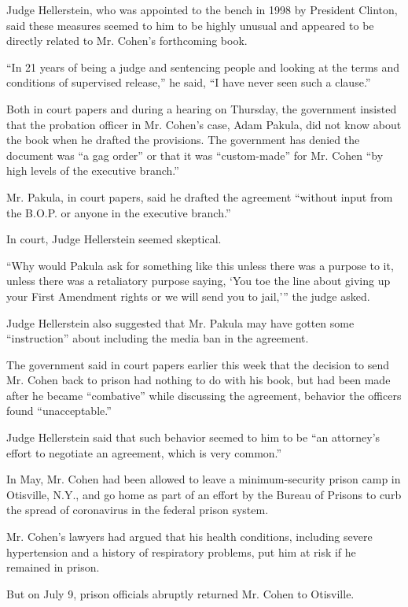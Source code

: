 Judge Hellerstein, who was appointed to the bench in 1998 by President
Clinton, said these measures seemed to him to be highly unusual and
appeared to be directly related to Mr. Cohen's forthcoming book.

``In 21 years of being a judge and sentencing people and looking at the
terms and conditions of supervised release,'' he said, ``I have never
seen such a clause.''

Both in court papers and during a hearing on Thursday, the government
insisted that the probation officer in Mr. Cohen's case, Adam Pakula,
did not know about the book when he drafted the provisions. The
government has denied the document was ``a gag order'' or that it was
``custom-made'' for Mr. Cohen ``by high levels of the executive
branch.''

Mr. Pakula, in court papers, said he drafted the agreement ``without
input from the B.O.P. or anyone in the executive branch.''

In court, Judge Hellerstein seemed skeptical.

``Why would Pakula ask for something like this unless there was a
purpose to it, unless there was a retaliatory purpose saying, `You toe
the line about giving up your First Amendment rights or we will send you
to jail,''' the judge asked.

Judge Hellerstein also suggested that Mr. Pakula may have gotten some
``instruction'' about including the media ban in the agreement.

The government said in court papers earlier this week that the decision
to send Mr. Cohen back to prison had nothing to do with his book, but
had been made after he became ``combative'' while discussing the
agreement, behavior the officers found ``unacceptable.''

Judge Hellerstein said that such behavior seemed to him to be ``an
attorney's effort to negotiate an agreement, which is very common.''

In May, Mr. Cohen had been allowed to leave a minimum-security prison
camp in Otisville, N.Y., and go home as part of an effort by the Bureau
of Prisons to curb the spread of coronavirus in the federal prison
system.

Mr. Cohen's lawyers had argued that his health conditions, including
severe hypertension and a history of respiratory problems, put him at
risk if he remained in prison.

But on July 9, prison officials abruptly returned Mr. Cohen to
Otisville.

